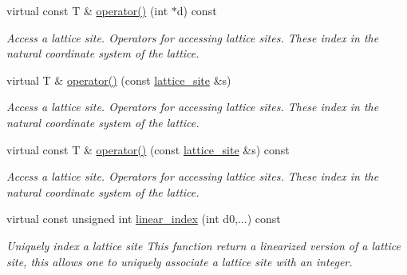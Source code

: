 \begin{DoxyCompactItemize}
\mbox{\label{classsisl_1_1cartesian__planar_a540abb67ec834261a6d41fd4b4db108f}} 
virtual const T \& \hyperlink{classsisl_1_1cartesian__planar_a540abb67ec834261a6d41fd4b4db108f}{operator()} (int $\ast$d) const
\begin{DoxyCompactList}\small\item\em Access a lattice site. Operators for accessing lattice sites. These index in the natural coordinate system of the lattice. \end{DoxyCompactList}\item 
\mbox{\label{classsisl_1_1cartesian__planar_a44af2be07514dec7db6509f1e7917f77}} 
virtual T \& \hyperlink{classsisl_1_1cartesian__planar_a44af2be07514dec7db6509f1e7917f77}{operator()} (const \hyperlink{namespacesisl_acd18feee4026583db6185df2b25434aa}{lattice\+\_\+site} \&s)
\begin{DoxyCompactList}\small\item\em Access a lattice site. Operators for accessing lattice sites. These index in the natural coordinate system of the lattice. \end{DoxyCompactList}\item 
\mbox{\label{classsisl_1_1cartesian__planar_acfe8f3200b5b9414d08afeea20c4bafd}} 
virtual const T \& \hyperlink{classsisl_1_1cartesian__planar_acfe8f3200b5b9414d08afeea20c4bafd}{operator()} (const \hyperlink{namespacesisl_acd18feee4026583db6185df2b25434aa}{lattice\+\_\+site} \&s) const
\begin{DoxyCompactList}\small\item\em Access a lattice site. Operators for accessing lattice sites. These index in the natural coordinate system of the lattice. \end{DoxyCompactList}\item 
\mbox{\label{classsisl_1_1cartesian__planar_a3f30c34e162863d0ef83f3cde628f87f}} 
virtual const unsigned int \hyperlink{classsisl_1_1cartesian__planar_a3f30c34e162863d0ef83f3cde628f87f}{linear\+\_\+index} (int d0,...) const
\begin{DoxyCompactList}\small\item\em Uniquely index a lattice site This function return a linearized version of a lattice site, this allows one to uniquely associate a lattice site with an integer. \end{DoxyCompactList}\item 

\end{DoxyCompactItemize}
